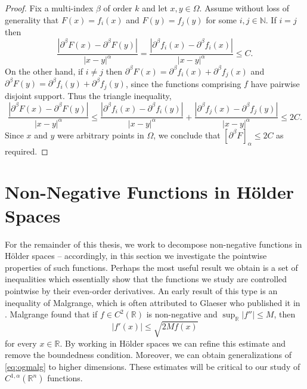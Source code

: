 \documentclass[oneside,hidelinks,indentfirst,10pt]{book}
\begin{document}
\begin{proof}

Fix a multi-index \(\beta\) of order \(k\) and let \(x,y\in\Omega\). Assume without loss of generality that \(F(x)=f_i(x)\) and \(F(y)=f_j(y)\) for some \(i,j\in\mathbb{N}\). If \(i=j\) then 
\[
    \frac{|\partial^\beta F(x)-\partial^\beta F(y)|}{|x-y|^\alpha}=\frac{|\partial^\beta f_i(x)-\partial^\beta f_i(x)|}{|x-y|^\alpha}\leq C.
\]
On the other hand, if \(i\neq j\) then \(\partial^\beta F(x)=\partial^\beta f_i(x)+\partial^\beta f_j(x)\) and \(\partial^\beta F(y)=\partial^\beta f_i(y)+\partial^\beta f_j(y)\), since the functions comprising \(f\) have pairwise disjoint support. Thus the triangle inequality,
\[
    \frac{|\partial^\beta F(x)-\partial^\beta F(y)|}{|x-y|^\alpha}\leq \frac{|\partial^\beta f_i(x)-\partial^\beta f_i(y)|}{|x-y|^\alpha}+\frac{|\partial^\beta f_j(x)-\partial^\beta f_j(y)|}{|x-y|^\alpha}\leq 2C.
\]
Since \(x\) and \(y\) were arbitrary points in \(\Omega\), we conclude that \([\partial^\beta F]_\alpha\leq 2C\) as required. 
\end{proof}


\section{Non-Negative Functions in H\"older Spaces}\label{sec:nn}


For the remainder of this thesis, we work to decompose non-negative functions in H\"older spaces -- accordingly, in this section we investigate the pointwise properties of such functions. Perhaps the most useful result we obtain is a set of inequalities which essentially show that the functions we study are controlled pointwise by their even-order derivatives. An early result of this type is an inequality of Malgrange, which is often attributed to Glaeser who published it in \cite{Glaeser}. Malgrange found that if \(f\in C^2(\mathbb{R})\) is non-negative and \(\sup_\mathbb{R}|f''|\leq M\), then
\begin{equation}\label{eq:ogmalg}
    |f'(x)|\leq \sqrt{2Mf(x)}    
\end{equation}
for every \(x\in\mathbb{R}\). By working in H\"older spaces we can refine this estimate and remove the boundedness condition. Moreover, we can obtain generalizations of \eqref{eq:ogmalg} to higher dimensions. These estimates will be critical to our study of \(C^{1,\alpha}(\mathbb{R}^n)\) functions.
\end{document}
